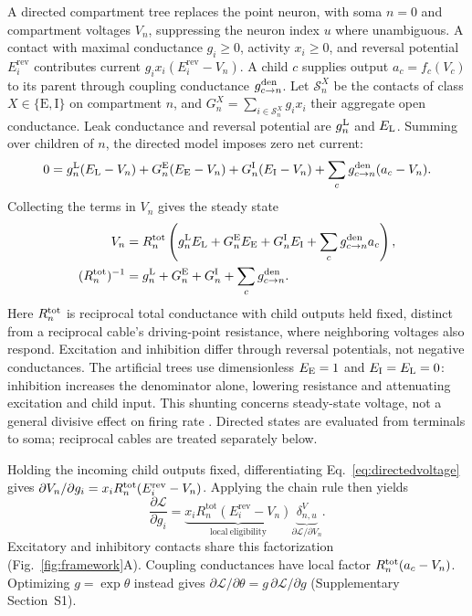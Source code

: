 \documentclass[11pt]{article}
\begin{document}
A directed compartment tree replaces the point neuron, with soma \(n=0\) and compartment voltages \(V_n\), suppressing the neuron index $u$ where unambiguous. A contact with maximal conductance \(g_i\geq0\), activity \(x_i\geq0\), and reversal potential \(E_i^{\mathrm{rev}}\) contributes current \(g_ix_i(E_i^{\mathrm{rev}}-V_n)\). A child \(c\) supplies output \(a_c=f_c(V_c)\) to its parent through coupling conductance \(g_{c\to n}^{\rm den}\). Let \(\mathcal S_n^X\) be the contacts of class \(X\in\{\mathrm E,\mathrm I\}\) on compartment $n$, and \(G_n^X=\sum_{i\in\mathcal S_n^X}g_ix_i\) their aggregate open conductance. Leak conductance and reversal potential are \(g_n^{\rm L}\) and \(E_{\rm L}\). Summing over children of $n$, the directed model imposes zero net current:
\[
0=g_n^{\rm L}(E_{\rm L}-V_n)
 +G_n^{\rm E}(E_{\rm E}-V_n)+G_n^{\rm I}(E_{\rm I}-V_n)
 +\sum_c g_{c\to n}^{\rm den}(a_c-V_n).
\]
Collecting the terms in \(V_n\) gives the steady state
\begin{equation}
\begin{aligned}
V_n&=R_n^{\rm tot}\left(g_n^{\rm L}E_{\rm L}+G_n^{\rm E}E_{\rm E}
 +G_n^{\rm I}E_{\rm I}+\sum_cg_{c\to n}^{\rm den}a_c\right),\\
(R_n^{\rm tot})^{-1}&=g_n^{\rm L}+G_n^{\rm E}+G_n^{\rm I}
 +\sum_cg_{c\to n}^{\rm den}.
\end{aligned}
\label{eq:directedvoltage}
\end{equation}
Here \(R_n^{\rm tot}\) is reciprocal total conductance with child outputs held fixed, distinct from a reciprocal cable's driving-point resistance, where neighboring voltages also respond. Excitation and inhibition differ through reversal potentials, not negative conductances. The artificial trees use dimensionless \(E_{\rm E}=1\) and \(E_{\rm I}=E_{\rm L}=0\): inhibition increases the denominator alone, lowering resistance and attenuating excitation and child input. This shunting concerns steady-state voltage, not a general divisive effect on firing rate \citep{holt1997shunting}. Directed states are evaluated from terminals to soma; reciprocal cables are treated separately below.

Holding the incoming child outputs fixed, differentiating Eq.~\ref{eq:directedvoltage} gives \(\partial V_n/\partial g_i=x_iR_n^{\rm tot}(E_i^{\rm rev}-V_n)\). Applying the chain rule then yields
\begin{equation}
\frac{\partial\mathcal L}{\partial g_i}
=\underbrace{x_iR_n^{\mathrm{tot}}(E_i^{\mathrm{rev}}-V_n)}_{\mathrm{local\ eligibility}}
\underbrace{\delta^V_{n,u}}_{\partial\mathcal L/\partial V_n}.
\label{eq:factorization}
\end{equation}
Excitatory and inhibitory contacts share this factorization (Fig.~\ref{fig:framework}A). Coupling conductances have local factor $R_n^{\rm tot}(a_c-V_n)$. Optimizing $g=\exp\theta$ instead gives $\partial\mathcal L/\partial\theta=g\,\partial\mathcal L/\partial g$ (Supplementary Section~S1).
\end{document}
